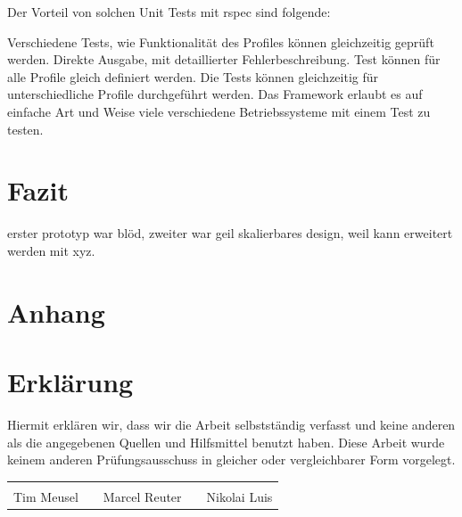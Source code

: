 Der Vorteil von solchen Unit Tests mit rspec sind folgende:

\begin{outline}
  \1 Verschiedene Tests, wie Funktionalität des Profiles können gleichzeitig
  geprüft werden.
  \1 Direkte Ausgabe, mit detaillierter Fehlerbeschreibung.
  \1 Test können für alle Profile gleich definiert werden.
  \1 Die Tests können gleichzeitig für unterschiedliche Profile durchgeführt
  werden.
  \1 Das Framework erlaubt es auf einfache Art und Weise viele verschiedene
  Betriebssysteme mit einem Test zu testen.
\end{outline}
\mr%

\chapter{Fazit}
erster prototyp war blöd, zweiter war geil
skalierbares design, weil
kann erweitert werden mit xyz.

\appendix

\printglossaries%

\printbibliography[heading=bibnumbered]

\chapter{Anhang}







\chapter{Erklärung}
Hiermit erklären wir, dass wir die Arbeit selbstständig verfasst und keine
anderen als die angegebenen Quellen und Hilfsmittel benutzt haben. Diese Arbeit
wurde keinem anderen Prüfungsausschuss in gleicher oder vergleichbarer Form
vorgelegt.

\vfill
{\centering
\renewcommand{\arraystretch}{0.9}
\begin{tabular}{p{}p{}p{}p{}p{}}
  \dotfill                    & & \dotfill                      & & \dotfill \\
  \centering\footnotesize{Tim Meusel}& & \centering\footnotesize{Marcel Reuter}& & \centering\footnotesize{Nikolai Luis}%
\end{tabular}
}

